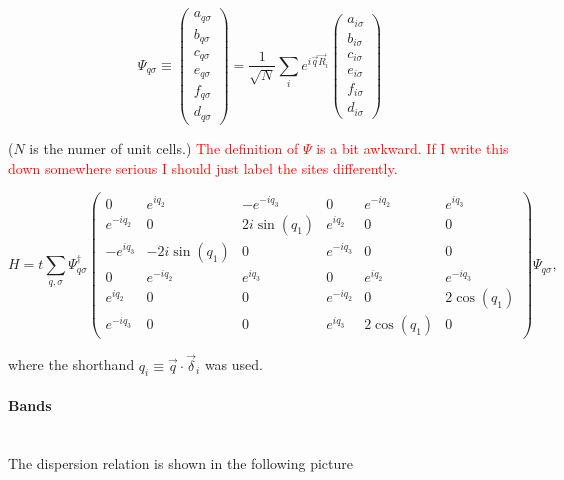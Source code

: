 \documentclass[../../../main.tex]{subfiles}
\begin{document}
\begin{equation}
	\Psi_{q\sigma} \equiv 
	\begin{pmatrix}
		a_{q\sigma} \\
		b_{q\sigma} \\
		c_{q\sigma} \\
		e_{q\sigma} \\
		f_{q\sigma} \\
		d_{q\sigma} 
	\end{pmatrix} = \frac{1}{\sqrt{N}} \sum_{i} e^{i\vec{q}\vec{R}_i}
	\begin{pmatrix}
		a_{i\sigma} \\
		b_{i\sigma} \\
		c_{i\sigma} \\
		e_{i\sigma} \\
		f_{i\sigma} \\
		d_{i\sigma} 
	\end{pmatrix}
\end{equation}

($N$ is the numer of unit cells.) \textcolor{red}{The definition of $\Psi$ is a bit awkward. If I write this down somewhere serious I should just label the sites differently.}

\begin{equation} \label{Hpirs}
	H = t \sum_{q,\sigma} \Psi_{q\sigma}^\dagger 
	\begin{pmatrix}
		0 & e^{iq_2} & -e^{-iq_3} & 0 & e^{-iq_2} & e^{iq_3} \\
		e^{-iq_2} & 0 & 2i\sin(q_1) & e^{iq_2} & 0 & 0 \\
		-e^{iq_3} & -2i\sin(q_1) & 0 & e^{-iq_3} & 0 & 0 \\
		0 & e^{-iq_2} & e^{iq_3} & 0 & e^{iq_2} & e^{-iq_3} \\
		e^{iq_2} & 0 & 0 &  e^{-iq_2} & 0 & 2\cos(q_1) \\
		e^{-iq_3} & 0 & 0 & e^{iq_3} & 2\cos(q_1) & 0 
	\end{pmatrix}
	\Psi_{q\sigma},
\end{equation}

where the shorthand $q_i \equiv \vec{q}\cdot\vec{\delta}_i$ was used. 

\paragraph{Bands} \hfill \\

The dispersion relation is shown in the following picture 
\end{document}
